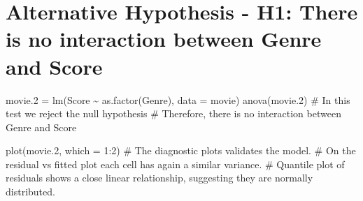 \documentclass[
]{article}
\begin{document}
\hypertarget{alternative-hypothesis---h1-there-is-no-interaction-between-genre-and-score}{%
\section{Alternative Hypothesis - H1: There is no interaction between
Genre and
Score}\label{alternative-hypothesis---h1-there-is-no-interaction-between-genre-and-score}}

movie.2 = lm(Score \textasciitilde{} as.factor(Genre), data = movie)
anova(movie.2) \# In this test we reject the null hypothesis \#
Therefore, there is no interaction between Genre and Score

plot(movie.2, which = 1:2) \# The diagnostic plots validates the model.
\# On the residual vs fitted plot each cell has again a similar
variance. \# Quantile plot of residuals shows a close linear
relationship, suggesting they are normally distributed.
\end{document}
